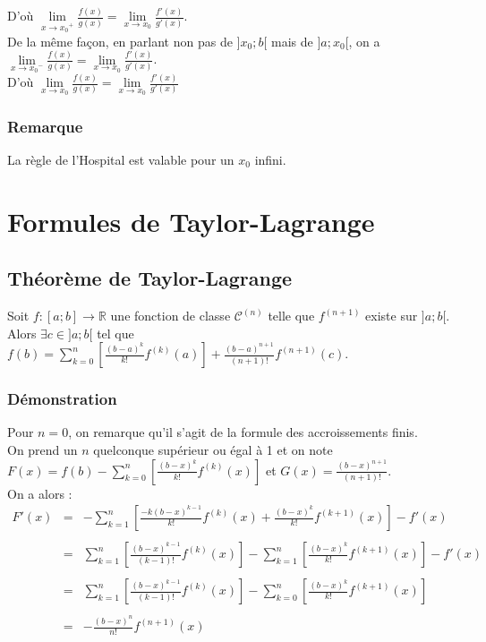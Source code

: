 \documentclass[a4paper,10pt]{book} %
\newcommand{\R}{\mathbb{R}}
\begin{document}
D'où $\lim\limits_{x\rightarrow x_0{}^+}\frac{f(x)}{g(x)}=\lim\limits_{x\rightarrow x_0}\frac{f'(x)}{g'(x)}$.\\

De la même façon, en parlant non pas de $]x_0;b[$ mais de $]a;x_0[$, on a $\lim\limits_{x\rightarrow x_0{}^-}\frac{f(x)}{g(x)}=\lim\limits_{x\rightarrow x_0}\frac{f'(x)}{g'(x)}$.\\

D'où $\lim\limits_{x\rightarrow x_0}\frac{f(x)}{g(x)}=\lim\limits_{x\rightarrow x_0}\frac{f'(x)}{g'(x)}$

\subsubsection{Remarque}
La règle de l'Hospital est valable pour un $x_0$ infini.

\newpage

\section{Formules de Taylor-Lagrange}
\subsection{Théorème de Taylor-Lagrange}
Soit $f : [a;b] \rightarrow \R$ une fonction de classe $\mathcal{C}^{(n)}$ telle que $f^{(n+1)}$ existe sur $]a;b[$.\\

Alors $\exists c\in ]a;b[$ tel que $f(b)=\sum\limits_{k=0}^n \left[\frac{(b-a)^k}{k!}f^{(k)}(a)\right]+\frac{(b-a)^{n+1}}{(n+1)!}f^{(n+1)}(c)$.

\subsubsection{Démonstration}
Pour $n=0$, on remarque qu'il s'agit de la formule des accroissements finis.\\

On prend un $n$ quelconque supérieur ou égal à 1 et on note $F(x)=f(b)-\sum\limits_{k=0}^n \left[\frac{(b-x)^k}{k!}f^{(k)}(x)\right]$ et $G(x)=\frac{(b-x)^{n+1}}{(n+1)!}$.\\

On a alors :\\

$\begin{array}{rcl} F'(x)&=&-\sum\limits_{k=1}^{n} \left[ \frac{-k(b-x)^{k-1}}{k!} f^{(k)}(x)+ \frac{(b-x)^{k}}{k!}f^{(k+1)}(x) \right]-f'(x)\\\\
&=&\sum\limits_{k=1}^n \left[\frac{(b-x)^{k-1}}{(k-1)!}f^{(k)}(x)\right]-\sum\limits_{k=1}^n \left[\frac{(b-x)^k}{k!}f^{(k+1)}(x)\right] -f'(x)\\\\
&=&\sum\limits_{k=1}^n \left[\frac{(b-x)^{k-1}}{(k-1)!}f^{(k)}(x)\right]-\sum\limits_{k=0}^n \left[\frac{(b-x)^k}{k!}f^{(k+1)}(x)\right]\\\\
&=&-\frac{(b-x)^{n}}{n!}f^{(n+1)}(x) \end{array}$\\\\\\
\end{document}
